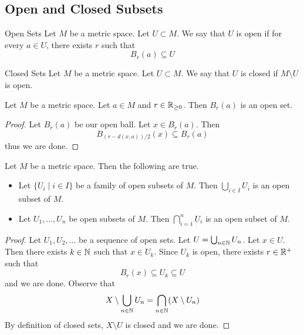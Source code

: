 \documentclass[a4paper]{article}
\begin{document}
\subsection{Open and Closed Subsets}
\begin{defn}{Open Sets}{} Let $M$ be a metric space. Let $U\subset M$. We say that $U$ is open if for every $a\in U$, there exists $r$ such that $$B_r(a)\subseteq U$$
\end{defn}

\begin{defn}{Closed Sets}{} Let $M$ be a metric space. Let $U\subset M$. We say that $U$ is closed if $M\setminus U$ is open. 
\end{defn}

\begin{lmm}{}{} Let $M$ be a metric space. Let $a\in M$ and $r\in\mathbb{R}_{\geq 0}$. Then $B_r(a)$ is an open set. 
\begin{proof} Let $B_r(a)$ be our open ball. Let $x\in B_r(a)$. Then $$B_{(r-d(x,a))/2}(x)\subseteq B_r(a)$$ thus we are done. 
\end{proof}
\end{lmm}

\begin{prp}{}{} Let $M$ be a metric space. Then the following are true. 
\begin{itemize}
\item Let $\{U_i\;|\;i\in I\}$ be a family of open subsets of $M$. Then $\bigcup_{i\in I}U_i$ is an open subset of $M$. 
\item Let $U_1,\dots,U_n$ be open subsets of $M$. Then $\bigcap_{i=1}^nU_i$ is an open subset of $M$. 
\end{itemize} 
\begin{proof} Let $U_1,U_2,\dots$ be a sequence of open sets. Let $U=\bigcup_{n\in\mathbb{N}}U_n$. Let $x\in U$. Then there exists $k\in\mathbb{N}$ such that $x\in U_k$. Since $U_k$ is open, there exists $r\in\mathbb{R}^+$ such that $$B_r(x)\subseteq U_k\subseteq U$$ and we are done. \linebreak\linebreak
Observe that $$X\setminus\bigcup_{n\in\mathbb{N}}U_n=\bigcap_{n\in\mathbb{N}}(X\setminus U_n)$$ By definition of closed sets, $X\setminus U$ is closed and we are done. 
\end{proof}
\end{prp}
\end{document}

